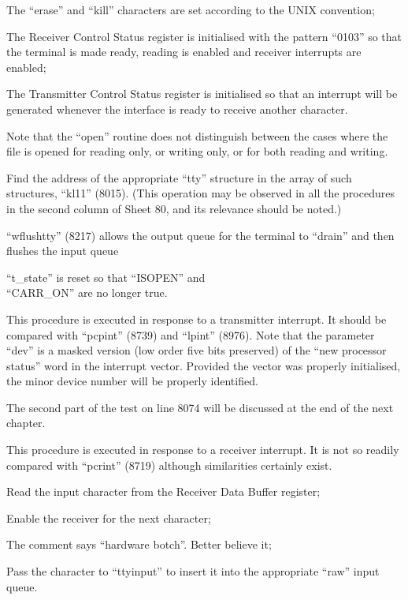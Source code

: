\item[8048:] The ``erase'' and ``kill'' characters
are set according to the UNIX
convention;

\item[8051:] The Receiver Control Status
register is initialised with the
pattern ``0103'' so that the terminal is made ready, reading is
enabled and receiver interrupts
are enabled;

\item[8052:] The Transmitter Control Status
register is initialised so that
an interrupt will be generated
whenever the interface is ready
to receive another character.
\ed

Note that the ``open'' routine does not
distinguish between the cases where the
file is opened for reading only, or
writing only, or for both reading and
writing.


\bd
\item[8057:] Find the address of the appropriate ``tty''
structure in the array
of such structures, ``kl11''
(8015). (This operation may be
observed in all the procedures in
the second column of Sheet 80,
and its relevance should be
noted.)

\item[8058:] ``wflushtty'' (8217) allows   the
output queue for the terminal to
``drain'' and then flushes the
input queue

\item[8059:] ``t\_state'' is reset so that ``ISOPEN''
and\\ ``CARR\_ON'' are no longer
true.
\ed


This procedure is executed in response
to a transmitter interrupt. It should
be compared with ``pcpint'' (8739) and
``lpint'' (8976). Note that the parameter
``dev'' is a masked version (low order
five bits preserved) of the ``new processor status'' word in the interrupt
vector. Provided the vector was properly initialised, the minor device
number will be properly identified.

The second part of the test on line
8074 will be discussed at the end of
the next chapter.


This procedure is executed in response
to a receiver interrupt. It is not so
readily compared with ``pcrint'' (8719)
although similarities certainly exist.

\bd
\item[8083:] Read the input character from the
Receiver Data Buffer register;

\item[8084:] Enable the receiver for the next
character;

\item[8085:] The comment says ``hardware
botch''. Better believe it;

\item[8086:] Pass the character to ``ttyinput''
to insert it into the appropriate
``raw'' input queue.
\ed
